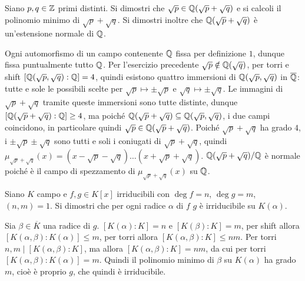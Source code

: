 \begin{exercise}
    Siano $p, q \in \mathbb{Z}$ primi distinti. Si dimostri che $\sqrt{p} \in \mathbb{Q}(\sqrt p + \sqrt q)$ e si calcoli il polinomio minimo di $\sqrt p + \sqrt q$. Si dimostri inoltre che $\mathbb{Q}(\sqrt p + \sqrt q)$ è un'estensione normale di $\mathbb{Q}$.
\end{exercise}
\begin{solution}
    Ogni automorfismo di un campo contenente $\mathbb{Q}$ fissa per definizione $1$, dunque fissa puntualmente tutto $\mathbb{Q}$. Per l'esercizio precedente $\sqrt p \notin \mathbb{Q}(\sqrt q)$, per torri e shift $[\mathbb{Q}(\sqrt p, \sqrt q) : \mathbb{Q}] = 4$, quindi esistono quattro immersioni di $\mathbb{Q}(\sqrt p, \sqrt q)$ in $\overline {\mathbb{Q}}$: tutte e sole le possibili scelte per $\sqrt p \mapsto \pm \sqrt p$ e $\sqrt q \mapsto \pm \sqrt q$. Le immagini di $\sqrt p + \sqrt q$ tramite queste immersioni sono tutte distinte, dunque $[\mathbb{Q}(\sqrt p + \sqrt q) : \mathbb{Q}] \ge 4$, ma poiché $\mathbb{Q}(\sqrt p + \sqrt q) \subseteq \mathbb{Q}(\sqrt p, \sqrt q)$, i due campi coincidono, in particolare quindi $\sqrt p \in \mathbb{Q}(\sqrt p + \sqrt q)$. Poiché $\sqrt p + \sqrt q$ ha grado $4$, i $\pm \sqrt p \pm \sqrt q$ sono tutti e soli i coniugati di $\sqrt p + \sqrt q$, quindi $\mu_{\sqrt p + \sqrt q}(x) = (x - \sqrt p - \sqrt q) \dots (x + \sqrt p + \sqrt q)$. $\mathbb{Q}(\sqrt p + \sqrt q)/\mathbb{Q}$ è normale poiché è il campo di spezzamento di $\mu_{\sqrt p + \sqrt q}(x)$ su $\mathbb{Q}$.
\end{solution}

\begin{exercise}
    Siano $K$ campo e $f, g \in K[x]$ irriducibili con $\deg f = n$, $\deg g = m$, $(n, m) = 1$. Si dimostri che per ogni radice $\alpha$ di $f$ $g$ è irriducibile su $K(\alpha)$.
\end{exercise}
\begin{solution}
    Sia $\beta \in \overline{K}$ una radice di $g$. $[K(\alpha) : K] = n$ e $[K(\beta) : K] = m$, per shift allora $[K(\alpha, \beta) : K(\alpha)] \le m$, per torri allora $[K(\alpha, \beta) : K] \le nm$. Per torri $n, m \mid [K(\alpha, \beta) : K]$, ma allora $[K(\alpha, \beta) : K] = nm$, da cui per torri $[K(\alpha, \beta) : K(\alpha)] = m$. Quindi il polinomio minimo di $\beta$ su $K(\alpha)$ ha grado $m$, cioè è proprio $g$, che quindi è irriducibile.
\end{solution}

